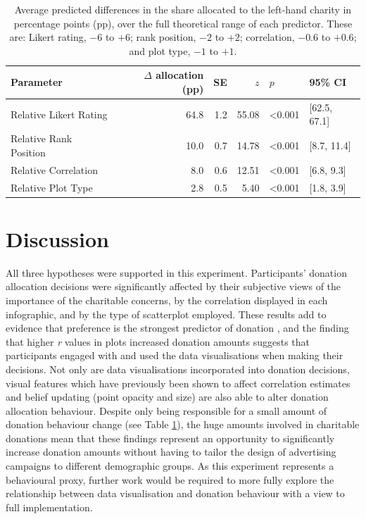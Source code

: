 \documentclass[
  authoryear,
  preprint,
  3p]{elsarticle}
\begin{document}
\begin{table}

\caption{\label{tab:unnamed-chunk-2}\label{tbl-marginal-effects-interactions}Average predicted differences in the share allocated to the left-hand charity in percentage points (pp), over the full theoretical range of each predictor. These are: Likert rating, $-6$ to $+6$; rank position, $-2$ to $+2$; correlation, $-0.6$ to $+0.6$; and plot type, $-1$ to $+1$.}
\centering
\begin{tabular}[t]{lrrrll}
\toprule
Parameter & $\Delta$ allocation (pp) & SE & $z$ & $p$ & 95\% CI\\
\midrule
Relative Likert Rating & 64.8 & 1.2 & 55.08 & <0.001 & {}[62.5, 67.1]\\
Relative Rank Position & 10.0 & 0.7 & 14.78 & <0.001 & {}[8.7, 11.4]\\
Relative Correlation & 8.0 & 0.6 & 12.51 & <0.001 & {}[6.8, 9.3]\\
Relative Plot Type & 2.8 & 0.5 & 5.40 & <0.001 & {}[1.8, 3.9]\\
\bottomrule
\end{tabular}
\end{table}

\section{Discussion}\label{sec-discussions}

All three hypotheses were supported in this experiment. Participants'
donation allocation decisions were significantly affected by their
subjective views of the importance of the charitable concerns, by the
correlation displayed in each infographic, and by the type of
scatterplot employed. These results add to evidence that preference is
the strongest predictor of donation
\citep{breeze_2013, berman_2018, macaskill_2019}, and the finding that
higher \emph{r} values in plots increased donation amounts suggests that
participants engaged with and used the data visualisations when making
their decisions. Not only are data visualisations incorporated into
donation decisions, visual features which have previously been shown to
affect correlation estimates and belief updating (point opacity and
size) are also able to alter donation allocation behaviour. Despite only
being responsible for a small amount of donation behaviour change (see
Table \ref{tbl-marginal-effects-interactions}), the huge amounts
involved in charitable donations \citep{gov_report} mean that these
findings represent an opportunity to significantly increase donation
amounts without having to tailor the design of advertising campaigns to
different demographic groups. As this experiment represents a
behavioural proxy, further work would be required to more fully explore
the relationship between data visualisation and donation behaviour with
a view to full implementation.
\end{document}
